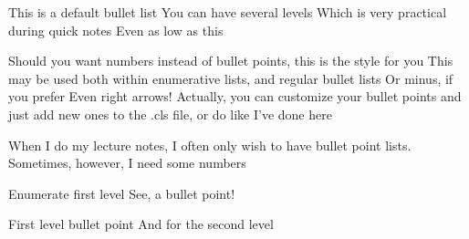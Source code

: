 \documentclass[12pt]{lecture}
\begin{document}

\bl %
\1 This is a default bullet list
\2 You can have several levels
\3 Which is very practical during quick notes
\4 Even as low as this
\plus 
\el %

\ble %
\1 Should you want numbers instead of bullet points, this is the style for you
\plus This may be used both within enumerative lists, and regular bullet lists
\minus Or minus, if you prefer
\ra Even right arrows!
 Actually, you can customize your bullet points and just add new ones to the .cls file, or do like I've done here
\el

\bl
\numfir  %
\1 When I do my lecture notes, I often only wish to have bullet point lists. Sometimes, however, I need some numbers

\1 Enumerate first level
\2 See, a bullet point!
\el

\bl
\numsec
\1 First level bullet point
\2 And for the second level

\el
\end{document}
